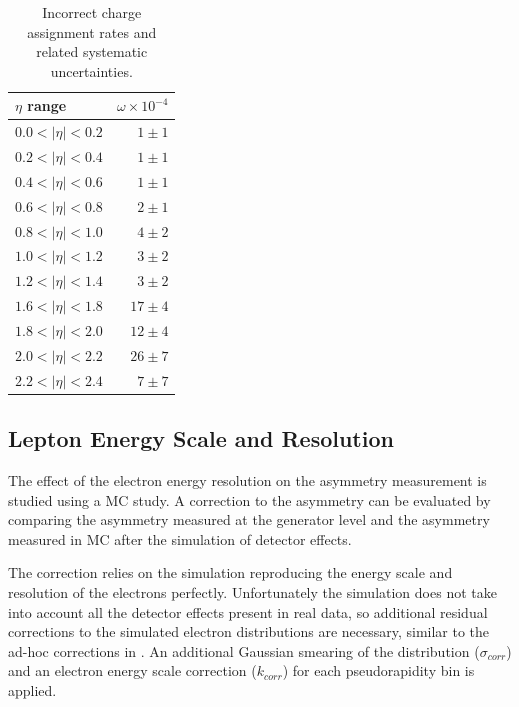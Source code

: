 \begin{table}[htbp]
  \begin{center}
\begin{tabular}{lr}
\toprule
$\eta$ range        & $\omega \times 10^{-4}$    \\
\midrule
$0.0<| \eta |<0.2$  & $ 1 \pm 1 $    \\ 
$0.2<| \eta |<0.4$  & $ 1 \pm 1 $    \\
$0.4<| \eta |<0.6$  & $ 1 \pm 1 $    \\
$0.6<| \eta |<0.8$  & $ 2 \pm 1 $    \\
$0.8<| \eta |<1.0$  & $ 4 \pm 2 $    \\ 
$1.0<| \eta |<1.2$  & $ 3 \pm 2 $    \\
$1.2<| \eta |<1.4$  & $ 3 \pm 2 $    \\
$1.6<| \eta |<1.8$  & $17 \pm 4 $    \\
$1.8<| \eta |<2.0$  & $12 \pm 4 $    \\
$2.0<| \eta |<2.2$  & $26 \pm 7 $    \\
$2.2<| \eta |<2.4$  & $ 7 \pm 7 $    \\
\bottomrule
\end{tabular}
\caption{\label{tab:mischarge}Incorrect charge assignment rates and related
systematic uncertainties\cite{bendavid2011electron}.}
\end{center}
\end{table}

\subsection{Lepton Energy Scale and Resolution}
The effect of the electron energy resolution on the asymmetry measurement is
studied using a {MC} study. A correction to the asymmetry can be evaluated by
comparing the asymmetry measured at the generator level and the asymmetry
measured in {MC} after the simulation of detector effects.

The correction relies on the simulation reproducing the energy scale and
resolution of the electrons perfectly. Unfortunately the simulation does not
take into account all the detector effects present in real data, so additional
residual corrections to the simulated electron \pT distributions are necessary,
similar to the ad-hoc corrections in . 
An additional Gaussian smearing of the \pT distribution ($\sigma_{corr}$) and an
electron energy scale correction ($k_{corr}$) for each pseudorapidity bin is
applied\cite{bauer2011higgs}.

